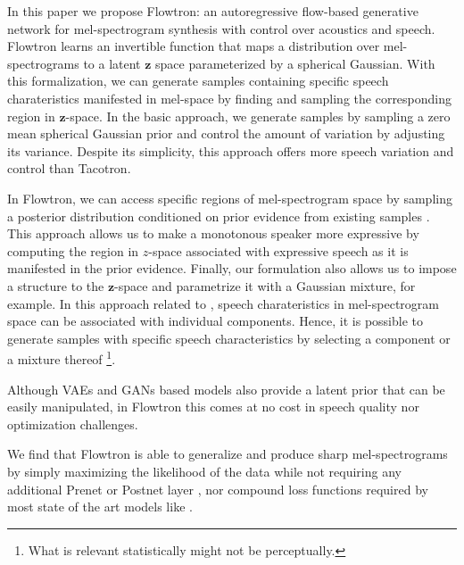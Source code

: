 \documentclass{article}
\begin{document}
In this paper we propose Flowtron: an autoregressive flow-based generative network for mel-spectrogram synthesis with control over acoustics and speech. Flowtron learns an invertible function that maps a distribution over mel-spectrograms to a latent $\boldsymbol{z}$ space parameterized by a spherical Gaussian. With this formalization, we can generate samples containing specific speech charateristics manifested in mel-space by finding and sampling the corresponding region in $\boldsymbol{z}$-space. In the basic approach, we generate samples by sampling a zero mean spherical Gaussian prior and control the amount of variation by adjusting its variance. Despite its simplicity, this approach offers more speech variation and control than Tacotron.

In Flowtron, we can access specific regions of mel-spectrogram space by sampling a posterior distribution conditioned on prior evidence from existing samples \cite{kingma2018glow, gambardella2019transflow}. This approach allows us to make a monotonous speaker more expressive by computing the region in $z$-space associated with expressive speech as it is manifested in the prior evidence. Finally, our formulation also allows us to impose a structure to the $\boldsymbol{z}$-space and parametrize it with a Gaussian mixture, for example. In this approach related to \cite{hsu2018hierarchical}, speech charateristics in mel-spectrogram space can be associated with individual components. Hence, it is possible to generate samples with specific speech characteristics by selecting a component or a mixture thereof \footnote{What is relevant statistically might not be perceptually.}.

Although VAEs and GANs \cite{hsu2018hierarchical,binkowski2019high, akuzawa2018expressive} based models also provide a latent prior that can be easily manipulated, in Flowtron this comes at no cost in speech quality nor optimization challenges.

We find that Flowtron is able to generalize and produce sharp mel-spectrograms by simply maximizing the likelihood of the data while not requiring any additional Prenet or Postnet layer \cite{wang2017tacotron}, nor compound loss functions required by most state of the art models like \cite{shen2017natural,arik2017deep,arik2017deep2,ping2017deep,skerry2018towards, wang2018style,binkowski2019high}.
\end{document}
